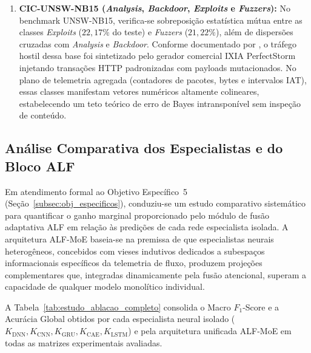 \begin{enumerate}
    \item \textbf{CIC-UNSW-NB15 (\emph{Analysis}, \emph{Backdoor}, \emph{Exploits} e \emph{Fuzzers}):}
    No benchmark UNSW-NB15, verifica-se sobreposição estatística mútua entre as classes \emph{Exploits}
    ($22{,}17\%$ do teste) e \emph{Fuzzers} ($21{,}22\%$), além de dispersões cruzadas com
    \emph{Analysis} e \emph{Backdoor}. Conforme documentado por , o
    tráfego hostil dessa base foi sintetizado pelo gerador comercial IXIA PerfectStorm injetando
    transações HTTP padronizadas com payloads mutacionados. No plano de telemetria agregada (contadores
    de pacotes, bytes e intervalos IAT), essas classes manifestam vetores numéricos altamente
    colineares, estabelecendo um teto teórico de erro de Bayes intransponível sem inspeção de conteúdo.
\end{enumerate}

\subsection{Análise Comparativa dos Especialistas e do Bloco ALF}
\label{subsec:estudo_ablacao}

Em atendimento formal ao Objetivo Específico~5 (Seção~\ref{subsec:obj_especificos}), conduziu-se um
estudo comparativo sistemático para quantificar o ganho marginal proporcionado pelo módulo de fusão
adaptativa ALF em relação às predições de cada rede especialista isolada. A arquitetura ALF-MoE
baseia-se na premissa de que especialistas neurais heterogêneos, concebidos com vieses indutivos
dedicados a subespaços informacionais específicos da telemetria de fluxo, produzem projeções
complementares que, integradas dinamicamente pela fusão atencional, superam a capacidade de qualquer
modelo monolítico individual.

A Tabela~\ref{tab:estudo_ablacao_completo} consolida o Macro $F_1$-Score e a Acurácia Global obtidos
por cada especialista neural isolado ($K_{\mathrm{DNN}}, K_{\mathrm{CNN}},
K_{\mathrm{GRU}}, K_{\mathrm{CAE}}, K_{\mathrm{LSTM}}$) e pela
arquitetura unificada ALF-MoE em todas as matrizes experimentais avaliadas.


